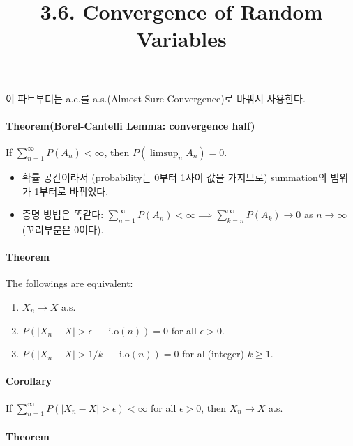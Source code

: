 \documentclass[]{article}
\title{3.6. Convergence of Random Variables}
\author{}
\date{\vspace{-2.5em}}
\let\oldparagraph\paragraph
\renewcommand{\paragraph}[1]{\oldparagraph{#1}\mbox{}}
\begin{document}
\maketitle

이 파트부터는 a.e.를 a.s.(Almost Sure Convergence)로 바꿔서 사용한다.

\hypertarget{theoremborel-cantelli-lemma-convergence-half}{%
\paragraph{Theorem(Borel-Cantelli Lemma: convergence
half)}\label{theoremborel-cantelli-lemma-convergence-half}}

If \(\sum_{n=1}^{\infty}P(A_n)<\infty\), then \(P(\limsup_nA_n)=0\).

\begin{itemize}
\item
  확률 공간이라서 (probability는 0부터 1사이 값을 가지므로) summation의
  범위가 1부터로 바뀌었다.
\item
  증명 방법은 똑같다:
  \(\sum_{n=1}^{\infty}P(A_n)<\infty\implies \sum_{k=n}^\infty P(A_k)\rightarrow 0\)
  as \(n\rightarrow\infty\)(꼬리부분은 0이다).
\end{itemize}

\hypertarget{theorem}{%
\paragraph{Theorem}\label{theorem}}

The followings are equivalent:

\begin{enumerate}
\def\labelenumi{\arabic{enumi}.}
\item
  \(X_n\rightarrow X\) a.s.
\item
  \(P(|X_n-X|>\epsilon\mbox{ }\mbox{ }\mbox{ i.o}(n))=0\) for all
  \(\epsilon >0\).
\item
  \(P(|X_n-X|>1/k\mbox{ }\mbox{ }\mbox{ i.o}(n))=0\) for all(integer)
  \(k\ge 1\).
\end{enumerate}

\hypertarget{corollary}{%
\paragraph{Corollary}\label{corollary}}

If \(\sum_{n=1}^\infty P(|X_n-X|>\epsilon)<\infty\) for all
\(\epsilon>0\), then \(X_n\rightarrow X\) a.s.

\hypertarget{theorem-1}{%
\paragraph{Theorem}\label{theorem-1}}
\end{document}
